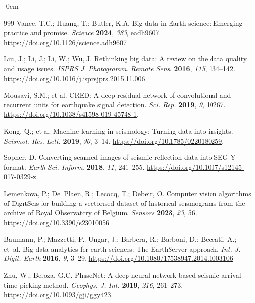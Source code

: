 \documentclass[data,article,accept,pdftex,moreauthors]{Definitions/mdpi}
\begin{document}
\begin{adjustwidth}{-\extralength}{0cm}
\begin{thebibliography}{999}
Vance, T.C.; Huang, T.; Butler, K.A. Big data in Earth science: Emerging practice and promise. \emph{Science} \textbf{2024}, \emph{383}, eadh9607. \url{https://doi.org/10.1126/science.adh9607}%

Liu, J.; Li, J.; Li, W.; Wu, J. Rethinking big data: A review on the data quality and usage issues. \emph{ISPRS J. Photogramm. Remote Sens.} \textbf{2016}, \emph{115}, 134--142. \url{https://doi.org/10.1016/j.isprsjprs.2015.11.006}

Mousavi, S.M.; et al. CRED: A deep residual network of convolutional and recurrent units for earthquake signal detection. \emph{Sci. Rep.} \textbf{2019}, \emph{9}, 10267. \url{https://doi.org/10.1038/s41598-019-45748-1}. %

Kong, Q.; et al. Machine learning in seismology: Turning data into insights. \emph{Seismol. Res. Lett.} \textbf{2019}, \emph{90}, 3--14. \url{https://doi.org/10.1785/0220180259}.

Sopher, D. Converting scanned images of seismic reflection data into SEG-Y format. \emph{Earth Sci. Inform.} \textbf{2018}, \emph{11}, 241--255. \url{https://doi.org/10.1007/s12145-017-0329-z}

Lemenkova, P.; De~Plaen, R.; Lecocq, T.; Debeir, O. Computer vision algorithms of DigitSeis for building a vectorised dataset of historical seismograms from the archive of Royal Observatory of Belgium. \emph{Sensors} \textbf{2023}, \emph{23}, 56. \url{https://doi.org/10.3390/s23010056}

Baumann, P.; Mazzetti, P.; Ungar, J.; Barbera, R.; Barboni, D.; Beccati, A.; et~al. Big data analytics for earth sciences: The EarthServer approach. \emph{Int. J. Digit. Earth} \textbf{2016}, \emph{9}, 3--29. \url{https://doi.org/10.1080/17538947.2014.1003106}

Zhu, W.; Beroza, G.C. PhaseNet: A deep-neural-network-based seismic arrival-time picking method. \emph{Geophys. J. Int.} \textbf{2019}, \emph{216}, 261--273. \url{https://doi.org/10.1093/gji/ggy423}.


\end{thebibliography}
\end{adjustwidth}
\end{document}
